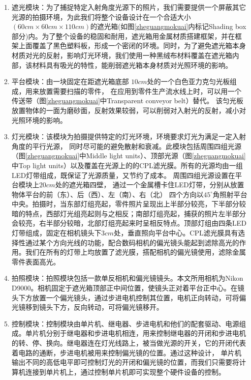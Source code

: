 \begin{enumerate}
\item 遮光模块：为了捕捉特定入射角度光源下的照片，我们需要提供一个屏蔽其它光源的拍摄环境，为此我们将整个设备设计在一个合适大小$(60cm\times 60cm\times 110cm)$的遮光箱(如图\ref{zheguangmokuai}内标记Shading box 部分)内。为了整个设备的稳固和耐用，遮光箱用金属材质搭建框架，并在框架上面覆盖了黑色塑料板，形成一个密闭的环境。同时，为了避免遮光箱本身材质对光的反射，影响灯光环境，我们使用一种黑绒布材料覆盖在遮光箱内部，该材料具有吸光的特性，能削弱遮光箱本身材质对光照环境的影响。
\item
平台模块：由一块固定在距遮光箱底部
$10cm$处的一个白色亚力克匀光板组成，用来放置需要扫描的零件，
在应用到零件生产流水线上时，可以用一个传送带（图\ref{zheguangmokuai}中Transparent conveyor belt）替代。
该匀光板放置物体的一面为磨砂面，反射效果较弱，可以削弱对入射光的反射，减小对光照环境的影响。
\item
灯光模块：该模块为拍摄提供特定的灯光环境，环境要求灯光为满足一定入射角度的平行光源，
同时尽可能的避免散射和衰减。此模块包括周围四组光源（图\ref{zheguangmokuai}中Middle light units）、顶部光源（图\ref{zheguangmokuai}中Top light units）以及覆盖在光源上的的CPL滤光膜。所有的光源均由一组LED灯带组成，既保证了光源质量，又节约了成本。
周围四组光源设置在平台模块上$20cm$处的遮光箱四壁，
通过一个金属槽卡住LED灯带，分别从放置物体平台的前（东）、后（西）、左（南）、右（北）
四个方向以${45}^{\circ}$角照射平台中央。拍摄时，当东部灯组亮起，零件照片呈现出上半部分较亮，下半部分较暗的特点，西部灯光组亮起则与之相反；南部灯组亮起，捕获的照片左半部分会较亮，右半部分较暗，北部灯组亮起来时呈相反特点。顶部灯组由四条LED灯带组成，固定在相机镜头下$3cm$处，垂直照向平台中心。CPL滤光膜具有选择性通过某个方向光线的功能，配合数码相机的偏光镜头能起到滤除高光的作用。我们在所有的灯带上均放置了滤光膜，搭配相机的偏光镜使用，滤除金属零件表面高光。
\item
拍照模块：拍照模块包括一款单反相机和偏光镜镜头。本文所用相机为Nikon D9000。相机固定于遮光箱顶部正中间位置，使镜头正对着平台正中心。在镜头下方放置一个偏光镜头，通过步进电机控制其位置，电机正向转动，可将偏光镜移到镜头下方，反向转动，可将偏光镜移开。
\item
控制模块：控制模块由单片机、继电器、步进电机和他们的配套驱动、电源组成。单片机分别于继电器和步进电机相连，用来控制继电器的开闭和步进电机的转、停、换向。继电器连在灯光线路上，被当做光源的开关，它的开闭代表着电路的通断，步进电机被用来控制偏光镜的位置。通过这种设计，
单片机输出不同的高低电平即可控制灯光的开闭和偏光镜的位置，而我们只需要将计算机连接到单片机上，通过控制单片机即可实现整个硬件设备的控制。
\end{enumerate}

